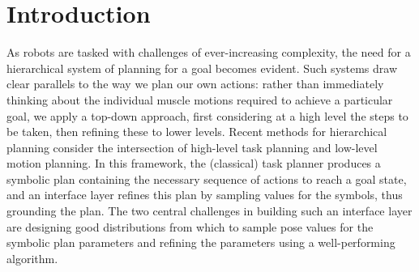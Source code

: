\section{Introduction}
As robots are tasked with challenges of ever-increasing complexity, the need
for a hierarchical system of planning for a goal becomes evident. Such systems
draw clear parallels to the way we plan our own actions: rather than
immediately thinking about the individual muscle motions required to achieve a particular
goal, we apply a top-down approach, first considering at a high level the
steps to be taken, then refining these to lower levels. Recent methods for
hierarchical planning consider the intersection of high-level task planning
and low-level motion planning. In this framework, the (classical) task planner produces
a symbolic plan containing the necessary sequence of actions to reach a goal
state, and an interface layer refines this plan by sampling values for
the symbols, thus grounding the plan. The two central challenges in building such
an interface layer are designing good distributions from which to sample
pose values for the symbolic plan parameters and refining the parameters using a
well-performing algorithm.

